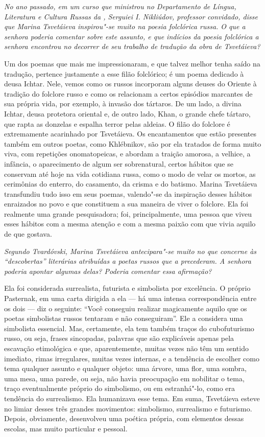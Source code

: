 \medskip

\emph{No ano passado, em um curso que ministrou no
Departamento de Língua, Literatura e Cultura Russas da , Serguiei I.
Nikliúdov, professor convidado, disse que Marina Tsvetáieva inspirou"-se
muito na poesia folclórica russa. O que a senhora poderia comentar sobre
este assunto, e que indícios da poesia folclórica a senhora encontrou no
decorrer de seu trabalho de tradução da obra de Tsvetáieva?}

Um dos poemas que mais me impressionaram, e que talvez
melhor tenha saído na tradução, pertence justamente a esse filão
folclórico; é um poema dedicado à deusa Ichtar. Nele, vemos como os
russos incorporam alguns deuses do Oriente à tradição do folclore russo
e como os relacionam a certos episódios marcantes de sua própria vida,
por exemplo, à invasão dos tártaros. De um lado, a divina Ichtar, deusa
protetora oriental e, de outro lado, Khan, o grande chefe tártaro, que
rapta as donzelas e espalha terror pelas aldeias. O filão do folclore é
extremamente acarinhado por Tsvetáieva. Os encantamentos que estão
presentes também em outros poetas, como Khlébnikov, são por ela tratados
de forma muito viva, com repetições onomatopeicas, e abordam a traição
amorosa, a velhice, a infância, o aparecimento de algum ser
sobrenatural, certos hábitos que se conservam até hoje na vida cotidiana
russa, como o modo de velar os mortos, as cerimônias do enterro, do
casamento, da crisma e do batismo. Marina Tsvetáieva transfundiu tudo
isso em seus poemas, valendo"-se da inspiração desses hábitos enraizados
no povo e que constituem a sua maneira de viver o folclore. Ela foi
realmente uma grande pesquisadora; foi, principalmente, uma pessoa que
viveu esses hábitos com a mesma atenção e com a mesma paixão com que
vivia aquilo de que gostava.

\medskip

\emph{Segundo Tvardóvski, Marina Tsvetáieva antecipara"-se
muito no que concerne às ``descobertas'' literárias atribuídas a poetas
russos que a precederam. A senhora poderia apontar algumas delas?
Poderia comentar essa afirmação?}

Ela foi considerada surrealista, futurista e simbolista
por excelência. O próprio Pasternak, em uma carta dirigida a ela --- há
uma intensa correspondência entre os dois --- diz o seguinte: ``Você
conseguiu realizar magicamente aquilo que os poetas simbolistas russos
tentaram e não conseguiram''. Ele a considera uma simbolista essencial.
Mas, certamente, ela tem também traços do cubofuturismo russo, ou seja,
frases sincopadas, palavras que são explicáveis apenas pela escavação
etimológica e que, aparentemente, muitas vezes não têm um sentido
imediato, rimas irregulares, muitas vezes internas, e a tendência de
escolher como tema qualquer assunto e qualquer objeto: uma árvore, uma
flor, uma sombra, uma mesa, uma parede, ou seja, não havia preocupação
em nobilitar o tema, traço eventualmente próprio do simbolismo, ou em
estranhá"-lo, como era tendência do surrealismo. Ela humanizava esse
tema. Em suma, Tsvetáieva esteve no limiar desses três grandes
movimentos: simbolismo, surrealismo e futurismo. Depois, obviamente,
desenvolveu uma poética própria, com elementos dessas escolas, mas muito
particular e pessoal.

